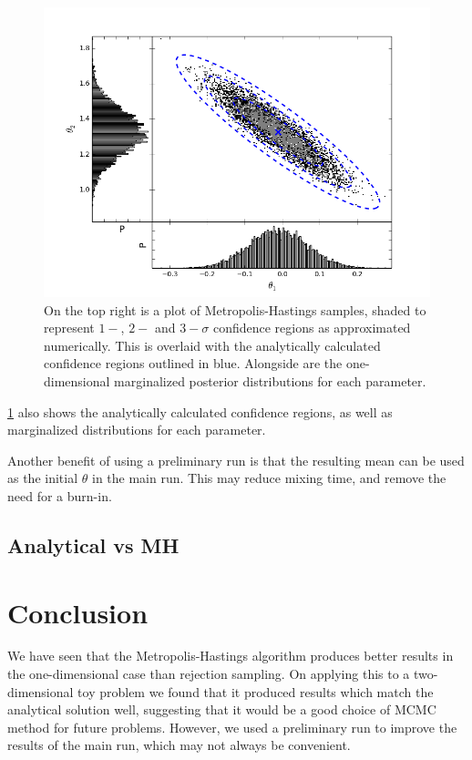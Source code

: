 \documentclass[a4paper,11pt,twoside]{article}
\begin{document}
\begin{figure}[htb]
	\centering
	\includegraphics[width=\textwidth]{marginalized.png}
	\caption{On the top right is a plot of Metropolis-Hastings samples, shaded to
	represent $1-$, $2-$ and $3-\sigma$ confidence regions as approximated
	numerically. This is overlaid with the analytically calculated confidence
	regions outlined in blue. Alongside are the one-dimensional marginalized posterior
	distributions for each parameter.}
	\label{fig:marginalized}
\end{figure}
\cref{fig:marginalized} also shows the analytically calculated confidence
regions, as well as marginalized distributions for each parameter.

Another benefit of using a preliminary run is that the resulting mean can be used
as the initial $\theta$ in the main run. This may reduce mixing time, and
remove the need for a burn-in\cite{handbook}.
\subsection{Analytical vs MH}

\section{Conclusion}
We have seen that the Metropolis-Hastings algorithm produces better results in
the one-dimensional case than rejection sampling. On applying this to a
two-dimensional toy problem we found that it produced results which match the
analytical solution well, suggesting that it would be a good choice of MCMC
method for future problems. However, we used a preliminary run to improve the
results of the main run, which may not always be convenient.
\end{document}
